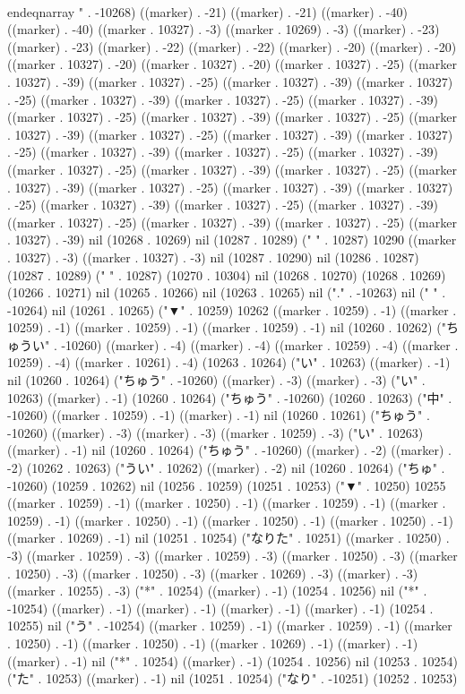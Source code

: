  \\end{eqnarray}
" . -10268) ((marker) . -21) ((marker) . -21) ((marker) . -40) ((marker) . -40) ((marker . 10327) . -3) ((marker . 10269) . -3) ((marker) . -23) ((marker) . -23) ((marker) . -22) ((marker) . -22) ((marker) . -20) ((marker) . -20) ((marker . 10327) . -20) ((marker . 10327) . -20) ((marker . 10327) . -25) ((marker . 10327) . -39) ((marker . 10327) . -25) ((marker . 10327) . -39) ((marker . 10327) . -25) ((marker . 10327) . -39) ((marker . 10327) . -25) ((marker . 10327) . -39) ((marker . 10327) . -25) ((marker . 10327) . -39) ((marker . 10327) . -25) ((marker . 10327) . -39) ((marker . 10327) . -25) ((marker . 10327) . -39) ((marker . 10327) . -25) ((marker . 10327) . -39) ((marker . 10327) . -25) ((marker . 10327) . -39) ((marker . 10327) . -25) ((marker . 10327) . -39) ((marker . 10327) . -25) ((marker . 10327) . -39) ((marker . 10327) . -25) ((marker . 10327) . -39) ((marker . 10327) . -25) ((marker . 10327) . -39) ((marker . 10327) . -25) ((marker . 10327) . -39) ((marker . 10327) . -25) ((marker . 10327) . -39) ((marker . 10327) . -25) ((marker . 10327) . -39) nil (10268 . 10269) nil (10287 . 10289) ("   " . 10287) 10290 ((marker . 10327) . -3) ((marker . 10327) . -3) nil (10287 . 10290) nil (10286 . 10287) (10287 . 10289) ("   " . 10287) (10270 . 10304) nil (10268 . 10270) (10268 . 10269) (10266 . 10271) nil (10265 . 10266) nil (10263 . 10265) nil ("." . -10263) nil (" " . -10264) nil (10261 . 10265) ("▼" . 10259) 10262 ((marker . 10259) . -1) ((marker . 10259) . -1) ((marker . 10259) . -1) ((marker . 10259) . -1) nil (10260 . 10262) ("ちゅうい" . -10260) ((marker) . -4) ((marker) . -4) ((marker . 10259) . -4) ((marker . 10259) . -4) ((marker . 10261) . -4) (10263 . 10264) ("い" . 10263) ((marker) . -1) nil (10260 . 10264) ("ちゅう" . -10260) ((marker) . -3) ((marker) . -3) ("い" . 10263) ((marker) . -1) (10260 . 10264) ("ちゅう" . -10260) (10260 . 10263) ("中" . -10260) ((marker . 10259) . -1) ((marker) . -1) nil (10260 . 10261) ("ちゅう" . -10260) ((marker) . -3) ((marker) . -3) ((marker . 10259) . -3) ("い" . 10263) ((marker) . -1) nil (10260 . 10264) ("ちゅう" . -10260) ((marker) . -2) ((marker) . -2) (10262 . 10263) ("うい" . 10262) ((marker) . -2) nil (10260 . 10264) ("ちゅ" . -10260) (10259 . 10262) nil (10256 . 10259) (10251 . 10253) ("▼" . 10250) 10255 ((marker . 10259) . -1) ((marker . 10250) . -1) ((marker . 10259) . -1) ((marker . 10259) . -1) ((marker . 10250) . -1) ((marker . 10250) . -1) ((marker . 10250) . -1) ((marker . 10269) . -1) nil (10251 . 10254) ("なりた" . 10251) ((marker . 10250) . -3) ((marker . 10259) . -3) ((marker . 10259) . -3) ((marker . 10250) . -3) ((marker . 10250) . -3) ((marker . 10250) . -3) ((marker . 10269) . -3) ((marker) . -3) ((marker . 10255) . -3) ("*" . 10254) ((marker) . -1) (10254 . 10256) nil ("*" . -10254) ((marker) . -1) ((marker) . -1) ((marker) . -1) ((marker) . -1) (10254 . 10255) nil ("う" . -10254) ((marker . 10259) . -1) ((marker . 10259) . -1) ((marker . 10250) . -1) ((marker . 10250) . -1) ((marker . 10269) . -1) ((marker) . -1) ((marker) . -1) nil ("*" . 10254) ((marker) . -1) (10254 . 10256) nil (10253 . 10254) ("た" . 10253) ((marker) . -1) nil (10251 . 10254) ("なり" . -10251) (10252 . 10253) 